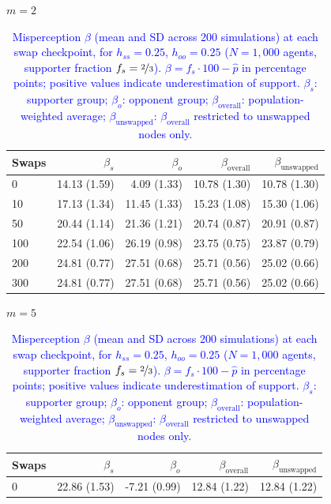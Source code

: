 
\begin{table}[H]
\centering
\caption{\textcolor{blue}{Misperception $\beta$ (mean and SD across 200 simulations) at each swap checkpoint, for $h_{ss} = 0.25$, $h_{oo} = 0.25$ ($N = 1{,}000$ agents, supporter fraction $f_s = \nicefrac{2}{3}$). $\beta = f_s \cdot 100 - \hat{p}$ in percentage points; positive values indicate underestimation of support. $\beta_s$: supporter group; $\beta_o$: opponent group; $\beta_{\mathrm{overall}}$: population-weighted average; $\beta_{\mathrm{unswapped}}$: $\beta_{\mathrm{overall}}$ restricted to unswapped nodes only.}}
\label{tab:subset_fs0667_hss250_hoo250}
\par\medskip
\noindent\textit{$m = 2$}\\[2pt]
\begin{tabular}{l rrrr}
\toprule
Swaps & $\beta_s$ & $\beta_o$ & $\beta_{\mathrm{overall}}$ & $\beta_{\mathrm{unswapped}}$ \\
\midrule
0 & 14.13 (1.59) & 4.09 (1.33) & 10.78 (1.30) & 10.78 (1.30) \\
10 & 17.13 (1.34) & 11.45 (1.33) & 15.23 (1.08) & 15.30 (1.06) \\
50 & 20.44 (1.14) & 21.36 (1.21) & 20.74 (0.87) & 20.91 (0.87) \\
100 & 22.54 (1.06) & 26.19 (0.98) & 23.75 (0.75) & 23.87 (0.79) \\
200 & 24.81 (0.77) & 27.51 (0.68) & 25.71 (0.56) & 25.02 (0.66) \\
300 & 24.81 (0.77) & 27.51 (0.68) & 25.71 (0.56) & 25.02 (0.66) \\
\bottomrule
\end{tabular}
\par\medskip
\noindent\textit{$m = 5$}\\[2pt]
\begin{tabular}{l rrrr}
\toprule
Swaps & $\beta_s$ & $\beta_o$ & $\beta_{\mathrm{overall}}$ & $\beta_{\mathrm{unswapped}}$ \\
\midrule
0 & 22.86 (1.53) & -7.21 (0.99) & 12.84 (1.22) & 12.84 (1.22) \\

\end{tabular}
\end{table}

